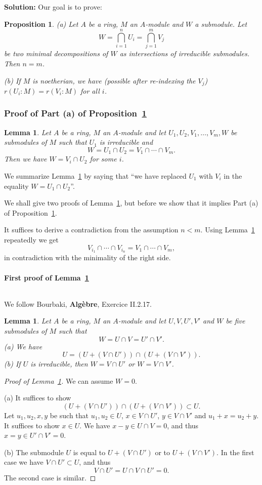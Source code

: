 \documentclass[parskip=half,fontsize=12pt]{scrartcl}%
\newtheorem{lem}[thm]{Lemma}
\newtheorem{prop}[thm]{Proposition}
\begin{document}
\textbf{Solution:} Our goal is to prove:

\begin{prop}\label{719P1}
(a) Let $A$ be a ring, $M$ an $A$-module and $W$ a submodule. Let 
$$
W=\bigcap_{i=1}^nU_i=\bigcap_{j=1}^mV_j
$$ 
be two minimal decompositions of $W$ as intersections of irreducible submodules. Then $n=m$.

(b) If $M$ is noetherian, we have (possible after re-indexing the $V_j$) $r(U_i:M)=r(V_i:M)$ for all $i$.
\end{prop}

\subsubsection{Proof of Part (a) of Proposition~\ref{719P1}}%


\begin{lem}\label{719L2}
Let $A$ be a ring, $M$ an $A$-module and let $U_1,U_2,V_1,\dots,V_m,W$ be submodules of $M$ such that $U_1$ is irreducible and 
$$
W=U_1\cap U_2=V_1\cap\cdots\cap V_m.
$$ 
Then we have $W=V_i\cap U_2$ for some $i$. 
\end{lem} 

We summarize Lemma~\ref{719L2} by saying that ``we have replaced $U_1$ with $V_i$ in the equality $W=U_1\cap U_2$''.

We shall give two proofs of Lemma~\ref{719L2}, but before we show that it implies Part (a) of Proposition~\ref{719P1}.

It suffices to derive a contradiction from the assumption $n<m$. Using Lemma~\ref{719L2} repeatedly we get 
$$
V_{i_1}\cap\cdots\cap V_{i_n}=V_1\cap\cdots\cap V_m,
$$ 
in contradiction with the minimality of the right side.

\paragraph{First proof of Lemma~\ref{719L2}}${}$\medskip%

We follow Bourbaki, \textbf{Algèbre}, Exercice II.2.17.

\begin{lem}\label{719L3}
Let $A$ be a ring, $M$ an $A$-module and let $U,V,U',V'$ and $W$ be five submodules of $M$ such that 
$$
W=U\cap V=U'\cap V'.
$$ 
(a) We have 
$$
U=(U+(V\cap U'))\cap(U+(V\cap V')).
$$ 
(b) If $U$ is irreducible, then $W=V\cap U'$ or $W=V\cap V'$. 
\end{lem} 
\begin{proof}[Proof of Lemma~\ref{719L3}] We can assume $W=0$. 

(a) It suffices to show 
$$
(U+(V\cap U'))\cap(U+(V\cap V'))\subset U. 
$$ 
Let $u_1,u_2,x,y$ be such that $u_1,u_2\in U$, $x\in V\cap U'$, $y\in V\cap V'$ and $u_1+x=u_2+y$. It suffices to show $x\in U$. We have $x-y\in U\cap V=0$, and thus $x=y\in U'\cap V'=0$. 

(b) The submodule $U$ is equal to $U+(V\cap U')$ or to $U+(V\cap V')$. In the first case we have $V\cap U'\subset U$, and thus 
$$
V\cap U'=U\cap V\cap U'=0. 
$$ 
The second case is similar. 
\end{proof} 
\end{document}
